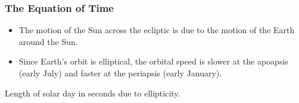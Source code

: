 \documentclass{beamer}
\begin{document}
\begin{frame}
  \frametitle{The Equation of Time}

  \begin{itemize}
  \item The motion of the Sun across the ecliptic is due to the motion of the
    Earth around the Sun.
  \item Since Earth's orbit is elliptical, the orbital speed is slower at the
    apoapsis (early July) and faster at the periapsis (early January).
  \end{itemize}

  \begin{center}

    Length of solar day in seconds due to ellipticity.
  \end{center}
\end{frame}
\end{document}
